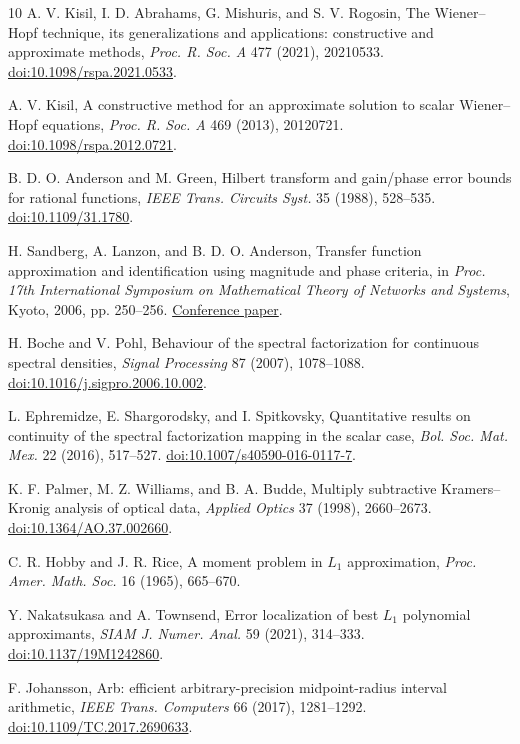 \documentclass[11pt]{article}
\theoremstyle{remark}\newtheorem{remark}[theorem]{Remark}
\begin{document}
\begin{thebibliography}{10}
A. V. Kisil, I. D. Abrahams, G. Mishuris, and S. V. Rogosin,
The Wiener--Hopf technique, its generalizations and applications:
constructive and approximate methods,
\emph{Proc. R. Soc. A} 477 (2021), 20210533.
\href{https://doi.org/10.1098/rspa.2021.0533}{doi:10.1098/rspa.2021.0533}.

A. V. Kisil,
A constructive method for an approximate solution to scalar Wiener--Hopf equations,
\emph{Proc. R. Soc. A} 469 (2013), 20120721.
\href{https://doi.org/10.1098/rspa.2012.0721}{doi:10.1098/rspa.2012.0721}.

B. D. O. Anderson and M. Green,
Hilbert transform and gain/phase error bounds for rational functions,
\emph{IEEE Trans. Circuits Syst.} 35 (1988), 528--535.
\href{https://doi.org/10.1109/31.1780}{doi:10.1109/31.1780}.

H. Sandberg, A. Lanzon, and B. D. O. Anderson,
Transfer function approximation and identification using magnitude and phase criteria,
in \emph{Proc. 17th International Symposium on Mathematical Theory of Networks
and Systems}, Kyoto, 2006, pp. 250--256.
\href{https://mathweb.ucsd.edu/~helton/MTNSHISTORY/CONTENTS/2006KYOTO/CONFERENCEWEBSITE/papers/0115.pdf}{Conference paper}.

H. Boche and V. Pohl,
Behaviour of the spectral factorization for continuous spectral densities,
\emph{Signal Processing} 87 (2007), 1078--1088.
\href{https://doi.org/10.1016/j.sigpro.2006.10.002}{doi:10.1016/j.sigpro.2006.10.002}.

L. Ephremidze, E. Shargorodsky, and I. Spitkovsky,
Quantitative results on continuity of the spectral factorization mapping in the
scalar case, \emph{Bol. Soc. Mat. Mex.} 22 (2016), 517--527.
\href{https://doi.org/10.1007/s40590-016-0117-7}{doi:10.1007/s40590-016-0117-7}.

K. F. Palmer, M. Z. Williams, and B. A. Budde,
Multiply subtractive Kramers--Kronig analysis of optical data,
\emph{Applied Optics} 37 (1998), 2660--2673.
\href{https://doi.org/10.1364/AO.37.002660}{doi:10.1364/AO.37.002660}.

C. R. Hobby and J. R. Rice,
A moment problem in $L_1$ approximation,
\emph{Proc. Amer. Math. Soc.} 16 (1965), 665--670.

Y. Nakatsukasa and A. Townsend,
Error localization of best $L_1$ polynomial approximants,
\emph{SIAM J. Numer. Anal.} 59 (2021), 314--333.
\href{https://doi.org/10.1137/19M1242860}{doi:10.1137/19M1242860}.

F. Johansson,
Arb: efficient arbitrary-precision midpoint-radius interval arithmetic,
\emph{IEEE Trans. Computers} 66 (2017), 1281--1292.
\href{https://doi.org/10.1109/TC.2017.2690633}{doi:10.1109/TC.2017.2690633}.
\end{thebibliography}
\end{document}
